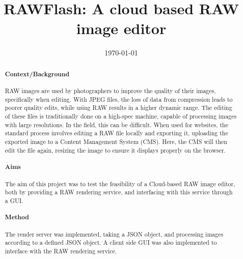 \documentclass[10pt,a4paper]{article}
\title{RAWFlash: A cloud based RAW image editor}
\author{} %
\date{\today}
\begin{document}
\maketitle

\begin{abstract}

\paragraph{Context/Background}
RAW images are used by photographers to improve the quality of their images, specifically when editing. With JPEG files, the loss of 
data from compression leads to poorer quality edits, while using RAW results in a higher dynamic range. The editing of these files is 
traditionally done on a high-spec machine, capable of processing images with large resolutions. In the field, this can be difficult. 
When used for websites, the standard process involves editing a RAW file locally and exporting it, uploading the exported image to a 
Content Management System (CMS). Here, the CMS will then edit the file again, resizing the image to ensure it displays properly on the
browser. 


\paragraph{Aims}
The aim of this project was to test the feasibility of a Cloud-based RAW image editor, both by providing a RAW rendering
service, and interfacing with this service through a GUI. 


\paragraph{Method}
The render server was implemented, taking a JSON object, and processing images according to a defined JSON object.
A client side GUI was also implemented to interface with the RAW rendering service.



\end{abstract}
\end{document}
